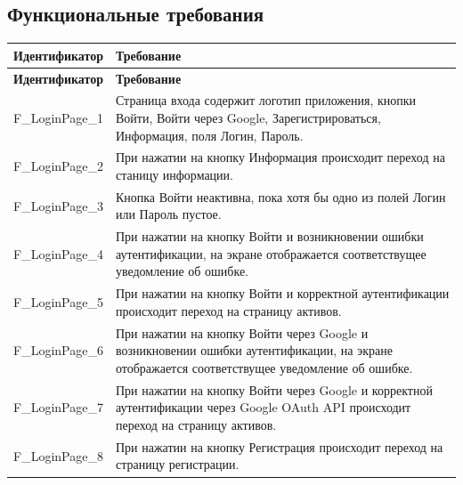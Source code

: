 \documentclass[a4paper, 14pt]{article}
\begin{document}
\subsection{Функциональные требования}

\begin{longtable}{| p{} | p{} |}
    \hline
    \textbf{Идентификатор}          & \textbf{Требование}                                                                                                                                                                \\
    \hline
    \endfirsthead
    \hline
    \textbf{Идентификатор}          & \textbf{Требование}                                                                                                                                                                \\
    \hline
    \endhead


    F\_LoginPage\_1                 & Страница входа содержит логотип приложения, кнопки Войти, Войти через Google, Зарегистрироваться, Информация, поля Логин, Пароль.                                                  \\ \hline
    F\_LoginPage\_2                 & При нажатии на кнопку Информация происходит переход на станицу информации.                                                                                                         \\ \hline
    F\_LoginPage\_3                 & Кнопка Войти неактивна, пока хотя бы одно из полей Логин или Пароль пустое.                                                                                                        \\ \hline
    F\_LoginPage\_4                 & При нажатии на кнопку Войти и возникновении ошибки аутентификации, на экране отображается соответствущее уведомление об ошибке.                                                    \\ \hline
    F\_LoginPage\_5                 & При нажатии на кнопку Войти и корректной аутентификации происходит переход на страницу активов.                                                                                    \\ \hline
    F\_LoginPage\_6                 & При нажатии на кнопку Войти через Google и возникновении ошибки аутентификации, на экране отображается соответствущее уведомление об ошибке.                                       \\ \hline
    F\_LoginPage\_7                 & При нажатии на кнопку Войти через Google и корректной аутентификации через Google OAuth API происходит переход на страницу активов.                                                \\ \hline
    F\_LoginPage\_8                 & При нажатии на кнопку Регистрация происходит переход на страницу регистрации.                                                                                                      \\ \hline


\end{longtable}
\end{document}
